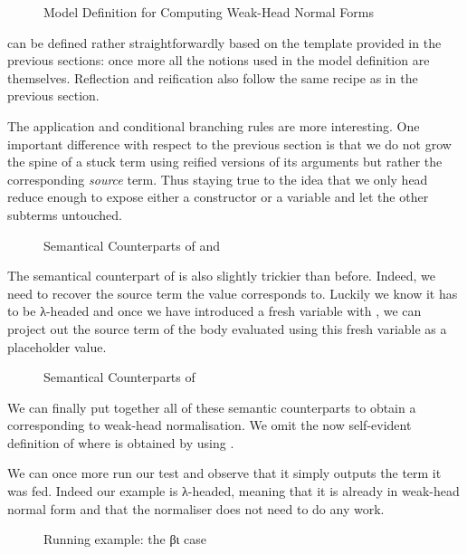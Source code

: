 \begin{figure}[h]
\caption{Model Definition for Computing Weak-Head Normal Forms\label{fig:betaiotamodel}}
\end{figure}

 can be defined rather straightforwardly based on the template
provided in the previous sections: once more all the notions used in the model
definition are  themselves. Reflection and reification also
follow the same recipe as in the previous section.

The application and conditional branching rules are more
interesting. One important difference with respect to the previous
section is that we do not grow the spine of a stuck term using
reified versions of its arguments but rather the corresponding
\emph{source} term. Thus staying true to the idea that we only head
reduce enough to expose either a constructor or a variable and let
the other subterms untouched.

\begin{figure}[h]
\caption{Semantical Counterparts of  and \label{fig:betaiotaappifte}}
\end{figure}

The semantical counterpart of  is also slightly trickier than
before. Indeed, we need to recover the source term the value corresponds
to. Luckily we know it has to be λ-headed and once we have introduced a
fresh variable with , we can project out the source term of
the body evaluated using this fresh variable as a placeholder value.

\begin{figure}[h]
\caption{Semantical Counterparts of \label{fig:betaiotalam}}
\end{figure}

We can finally put together all of these semantic counterparts to
obtain a  corresponding to weak-head normalisation.
We omit the now self-evident definition of  where 
is obtained by using .

We can once more run our test and observe that it simply outputs the
term it was fed. Indeed our example is λ-headed, meaning that it is
already in weak-head normal form and that the normaliser does not need
to do any work.

\begin{figure}[h]
\caption{Running example: the βι case}\label{fig:betaiotaxitest}
\end{figure}
